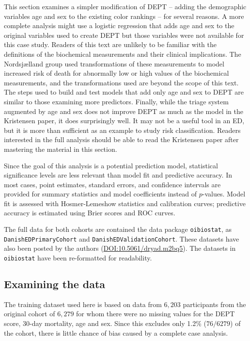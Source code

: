 This section examines a simpler modification of DEPT -- adding the demographic variables age and sex to the existing color rankings -- for several reasons. A more complete analysis might use a logistic regression that adds age and sex to the original variables used to create DEPT but those variables were not available for this case study.   Readers of this text are unlikely to be familiar with the definitions of the biochemical measurements and their clinical implications. The Nordsj{\ae}lland group used transformations of these measurements to model increased risk of death for abnormally low or high values of the biochemical measurements, and the transformations used are beyond the scope of this text. The steps used to build and test models that add only age and sex to DEPT are similar to those examining more predictors. Finally, while the triage system augmented by age and sex does not improve DEPT as much as the model in the Kristensen paper, it does surprisingly well.  It may not be a useful tool in an ED, but it is more than sufficient as an example to study risk classification.    Readers interested in the full analysis should be able to read the Kristensen paper after mastering the material in this section.

Since the goal of this analysis is a potential prediction model, statistical significance levels are less relevant than model fit and predictive accuracy.  In most cases, point estimates, standard errors, and confidence intervals are provided for summary statistics and model coefficients instead of $p$-values.  Model fit is assessed with Hosmer-Lemeshow statistics and calibration curves; predictive accuracy is estimated using Brier scores and ROC curves.

The full data for both cohorts are contained the data package \texttt{oibiostat}, as \texttt{DanishEDPrimaryCohort} and \texttt{DanishEDValidationCohort}.  These datasets have also been posted by the authors (\url{DOI:10.5061/dryad.m2bq5}).  The datasets in \texttt{oibiostat} have been re-formatted for readability.

\subsection{Examining the data}
\label{section:examiningDataDanishED}

The training dataset used here is based on data from $6,203$ participants from the original cohort of $6,279$ for whom there were no missing values for the DEPT score, 30-day mortality, age and sex.  Since this excludes only 1.2\% ($76/6279$) of the cohort, there is little chance of bias caused by a complete case analysis.  

